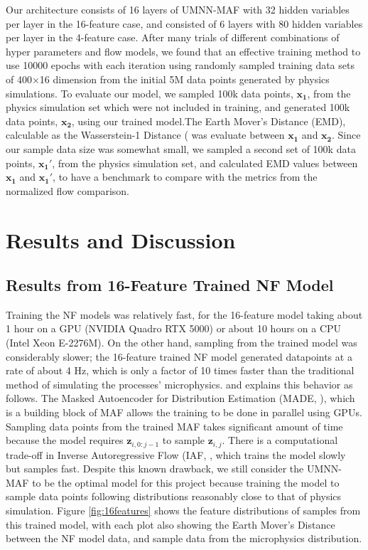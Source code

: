 Our architecture consists of 16 layers of UMNN-MAF with 32 hidden variables per layer in the 16-feature case, and consisted of 6 layers with 80 hidden variables per layer in the 4-feature case. After many trials of different combinations of hyper parameters and flow models, we found that an effective training method to use 10000 epochs with each iteration using randomly sampled training data sets of 400$\times$16 dimension from the initial 5M data points generated by physics simulations. To evaluate our model, we sampled 100k data points, $\mathbf{x_1}$, from the physics simulation set which were not included in training, and generated 100k data points, $\mathbf{x_2}$, using our trained model.The Earth Mover's Distance (EMD), calculable as the Wasserstein-1 Distance (\cite{Dobrushin} was evaluate between $\mathbf{x_1}$ and $\mathbf{x_2}$. Since our sample data size was somewhat small, we sampled a second set of 100k data points, $\mathbf{x_1'}$, from the physics simulation set, and calculated EMD values between  $\mathbf{x_1}$ and $\mathbf{x_1'}$, to have a benchmark to compare with the metrics from the normalized flow comparison.




\section{Results and Discussion}
\subsection{Results from 16-Feature Trained NF Model}
Training the NF models was relatively fast, for the 16-feature model taking about 1 hour on a GPU (NVIDIA Quadro RTX 5000) or about 10 hours on a CPU (Intel Xeon E-2276M). On the other hand, sampling from the trained model was considerably slower; the 16-feature trained NF model generated datapoints at a rate of about 4 Hz, which is only a factor of 10 times faster than the traditional method of simulating the processes' microphysics. \cite{NEURIPS20192a084e55} and \cite{papamakarios2018masked} explains this behavior as follows. The Masked Autoencoder for Distribution Estimation (MADE, \cite{pmlr-v37-germain15}), which is a building block of MAF allows the training to be done in parallel using GPUs. Sampling data points from the trained MAF takes significant amount of time because the model requires $\mathbf{z}_{i,0:j-1}$ to sample $\mathbf{z}_{i,j}$. There is a computational trade-off in Inverse Autoregressive Flow (IAF, \cite{NIPS2016ddeebdee}, which trains the model slowly but samples fast. Despite this known drawback, we still consider the UMNN-MAF to be the optimal model for this project because training the model to sample data points following distributions reasonably close to that of physics simulation. Figure \ref{fig:16features} shows the feature distributions of samples from this trained model, with each plot also showing the Earth Mover's Distance between the NF model data, and sample data from the microphysics distribution.


